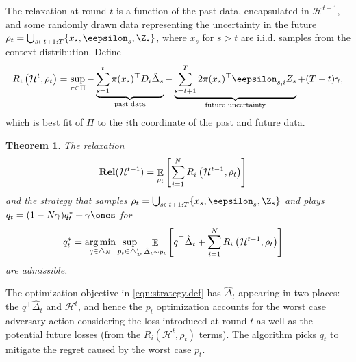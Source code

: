 \documentclass{article}
\newcommand{\exop}{\mathop{\ex}}
\newcommand{\rel}{\mathbf{Rel}}
\newcommand{\hist}{{\mathcal H}}
\newtheorem{theorem}{Theorem}
\begin{document}
The relaxation at round $t$ is a function of the past data, encapsulated in $\hist^{t-1}$, and some randomly drawn data representing the uncertainty in the future $\rho_t = \bigcup_{s \in t+1:T} \{x_{s},\eepsilon_{s},\Z_{s}\}$, where $x_s$ for $s>t$ are i.i.d. samples from the context distribution. Define
\begin{align}
    R_i\left(\hist^{t},\rho_t\right) =
  \sup_{\pi\in\Pi}
  -
  \underbrace{\sum_{s=1}^{t} \pi(x_s)^\top D_i \hat\Delta_s}_
  {\text{past data}}
  -
  \underbrace{\sum_{s=t+1}^{T} 2 \pi(x_s)^\top \eepsilon_{s,i} Z_s}_
  {\text{future uncertainty}}
  + (T-t)\gamma,
\end{align}
which is best fit of $\Pi$ to the $i$th coordinate of the past and future data.
\begin{theorem}\label{thm:admissibility}  
  The relaxation
  \begin{align}
    \rel(\hist^{t-1})
    &= \exop_{
      \rho_t}
      \left[
      \sum_{i=1}^N R_i\left(\hist^{t-1},\rho_t\right)\right]
 \label{eqn:relaxation.def}
  \end{align}
  and the strategy that samples $\rho_t = \bigcup_{s \in t+1:T} \{x_{s},\eepsilon_{s},\Z_{s}\}$ and plays  $q_t= (1-N\gamma)q_t^* + \gamma \ones$ for
\begin{align}
  q_t^*
  &=
  \argmin_{q \in \triangle_{N}}
  \sup_{p_t \in \triangle_{\mathcal D}'} 
    \exop_{\hat\Delta_t \sim p_t}\left[
    q^\top\hat\Delta_t
    +   \sum_{i=1}^N  R_i\left(\hist^{t-1},\rho_t\right)\right]
  \label{eqn:strategy.def}
\end{align}
are admissible.
\end{theorem}
The optimization objective in \eqref{eqn:strategy.def} has $\hat\Delta_t$ appearing in two places: the $q^\top\hat\Delta_t$ and $\hist^{t}$, and hence the $p_t$ optimization accounts for the worst case adversary action considering the loss introduced at round $t$ as well as the potential future losses (from the $R_i(\hist^t,\rho_t)$ terms). The algorithm picks $q_t$ to mitigate the regret caused by the worst case $p_t$.

\end{document}
